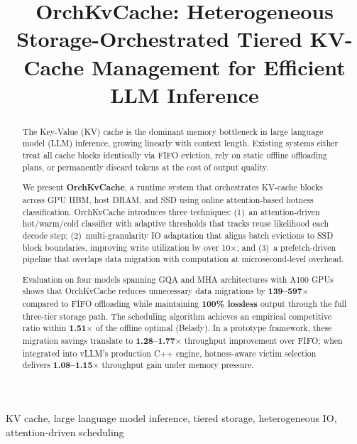 \documentclass[conference]{IEEEtran}
\begin{document}
\title{OrchKvCache: Heterogeneous Storage-Orchestrated Tiered KV-Cache Management for Efficient LLM Inference}

\author{
}

\maketitle


\begin{abstract}
The Key-Value (KV) cache is the dominant memory bottleneck in large language model (LLM) inference, growing linearly with context length. Existing systems either treat all cache blocks identically via FIFO eviction, rely on static offline offloading plans, or permanently discard tokens at the cost of output quality.

We present \textbf{OrchKvCache}, a runtime system that orchestrates KV-cache blocks across GPU HBM, host DRAM, and SSD using online attention-based hotness classification. OrchKvCache introduces three techniques: (1)~an attention-driven hot/warm/cold classifier with adaptive thresholds that tracks reuse likelihood each decode step; (2)~multi-granularity IO adaptation that aligns batch evictions to SSD block boundaries, improving write utilization by over 10$\times$; and (3)~a prefetch-driven pipeline that overlaps data migration with computation at microsecond-level overhead.

Evaluation on four models spanning GQA and MHA architectures with A100 GPUs shows that OrchKvCache reduces unnecessary data migrations by \textbf{139--597$\times$} compared to FIFO offloading while maintaining \textbf{100\% lossless} output through the full three-tier storage path. The scheduling algorithm achieves an empirical competitive ratio within \textbf{1.51$\times$} of the offline optimal (Belady). In a prototype framework, these migration savings translate to \textbf{1.28--1.77$\times$} throughput improvement over FIFO; when integrated into vLLM's production C++ engine, hotness-aware victim selection delivers \textbf{1.08--1.15$\times$} throughput gain under memory pressure.
\end{abstract}

\begin{IEEEkeywords}
KV cache, large language model inference, tiered storage, heterogeneous IO, attention-driven scheduling
\end{IEEEkeywords}
\end{document}
